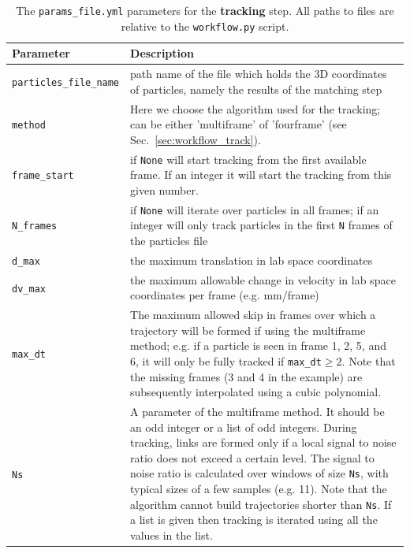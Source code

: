 \documentclass[10pt,a4paper]{article}
\begin{document}
\begin{table}[!ht]
	\centering
	\caption{The \texttt{params\_file.yml} parameters for the \textbf{tracking} step. All paths to files are relative to the \texttt{workflow.py} script.}
	\label{tab:tracking_params}
	\begin{tabular}{l m{12cm}}
		\hline
		Parameter & Description\\
		\hline
		
		\texttt{particles\_file\_name} & path name of the file which holds the 3D coordinates of particles, namely the results of the matching step  \\[.2cm]
		
		\texttt{method} & Here we choose the algorithm used for the tracking; can be either 'multiframe' of 'fourframe' (see Sec.~\ref{sec:workflow_track}). \\[.2cm]
		
		\texttt{frame\_start} & if \texttt{None} will start tracking from the first available frame. If an integer it will start the tracking from this given number. \\[.2cm]
		
		\texttt{N\_frames} & if \texttt{None} will iterate over particles in all frames; if an integer will only track particles in the first \texttt{N} frames of the particles file\\[.2cm]
		
		\texttt{d\_max} & the maximum translation in lab space coordinates \\[.2cm]
		
		\texttt{dv\_max} & the maximum allowable change in velocity in lab space coordinates per frame (e.g. mm/frame) \\[.2cm]
		
		\texttt{max\_dt} & The maximum allowed skip in frames over which a trajectory will be formed if using the multiframe method; e.g. if a particle is seen in frame 1, 2, 5, and 6, it will only be fully tracked if \texttt{max\_dt}$\geq 2$. Note that the missing frames (3 and 4 in the example) are subsequently interpolated using a cubic polynomial. \\[.2cm]
		
		\texttt{Ns} & A parameter of the multiframe method. It should be an odd integer or a list of odd integers. During tracking, links are formed only if a local signal to noise ratio does not exceed a certain level. The signal to noise ratio is calculated over windows of size \texttt{Ns}, with typical sizes of a few samples (e.g. 11). Note that the algorithm cannot build trajectories shorter than \texttt{Ns}. If a list is given then tracking is iterated using all the values in the list.\\[.2cm]
		

\end{tabular}
\end{table}
\end{document}
